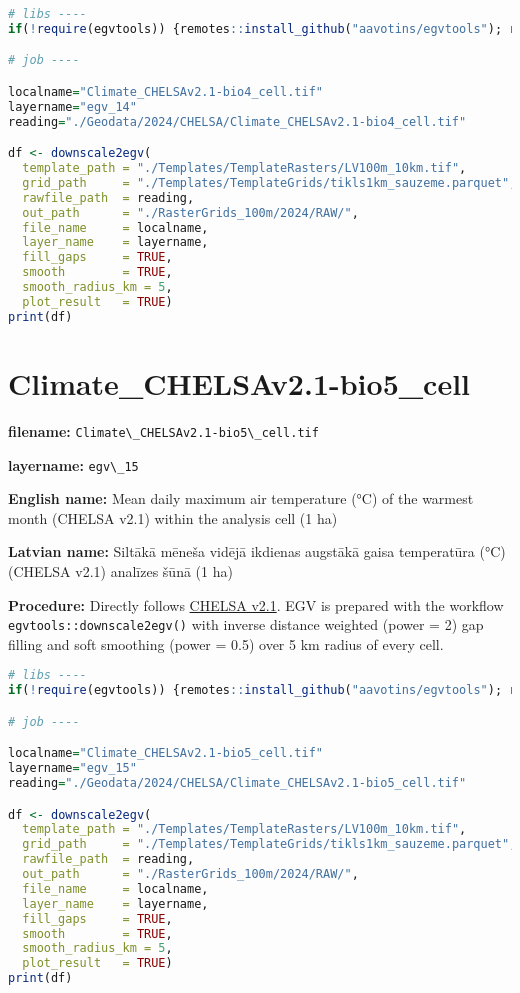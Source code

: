 \documentclass[
]{book}
\newcommand{\passthrough}[1]{#1}
\begin{document}
\begin{lstlisting}[language=R]
# libs ----
if(!require(egvtools)) {remotes::install_github("aavotins/egvtools"); require(egvtools)}

# job ----

localname="Climate_CHELSAv2.1-bio4_cell.tif"
layername="egv_14"
reading="./Geodata/2024/CHELSA/Climate_CHELSAv2.1-bio4_cell.tif"

df <- downscale2egv(
  template_path = "./Templates/TemplateRasters/LV100m_10km.tif",
  grid_path     = "./Templates/TemplateGrids/tikls1km_sauzeme.parquet",
  rawfile_path  = reading,
  out_path      = "./RasterGrids_100m/2024/RAW/",
  file_name     = localname,
  layer_name    = layername,
  fill_gaps     = TRUE,
  smooth        = TRUE,
  smooth_radius_km = 5,
  plot_result   = TRUE)
print(df)
\end{lstlisting}

\section{Climate\_CHELSAv2.1-bio5\_cell}\label{ch06.015}

\textbf{filename:} \passthrough{\lstinline!Climate\_CHELSAv2.1-bio5\_cell.tif!}

\textbf{layername:} \passthrough{\lstinline!egv\_15!}

\textbf{English name:} Mean daily maximum air temperature (°C) of the warmest month (CHELSA v2.1) within the analysis cell (1 ha)

\textbf{Latvian name:} Siltākā mēneša vidējā ikdienas augstākā gaisa temperatūra (°C) (CHELSA v2.1) analīzes šūnā (1 ha)

\textbf{Procedure:} Directly follows \hyperref[Ch04.11]{CHELSA v2.1}. EGV is prepared with the
workflow \passthrough{\lstinline!egvtools::downscale2egv()!} with inverse distance weighted (power = 2)
gap filling and soft smoothing (power = 0.5) over 5 km radius of every cell.

\begin{lstlisting}[language=R]
# libs ----
if(!require(egvtools)) {remotes::install_github("aavotins/egvtools"); require(egvtools)}

# job ----

localname="Climate_CHELSAv2.1-bio5_cell.tif"
layername="egv_15"
reading="./Geodata/2024/CHELSA/Climate_CHELSAv2.1-bio5_cell.tif"

df <- downscale2egv(
  template_path = "./Templates/TemplateRasters/LV100m_10km.tif",
  grid_path     = "./Templates/TemplateGrids/tikls1km_sauzeme.parquet",
  rawfile_path  = reading,
  out_path      = "./RasterGrids_100m/2024/RAW/",
  file_name     = localname,
  layer_name    = layername,
  fill_gaps     = TRUE,
  smooth        = TRUE,
  smooth_radius_km = 5,
  plot_result   = TRUE)
print(df)
\end{lstlisting}
\end{document}
